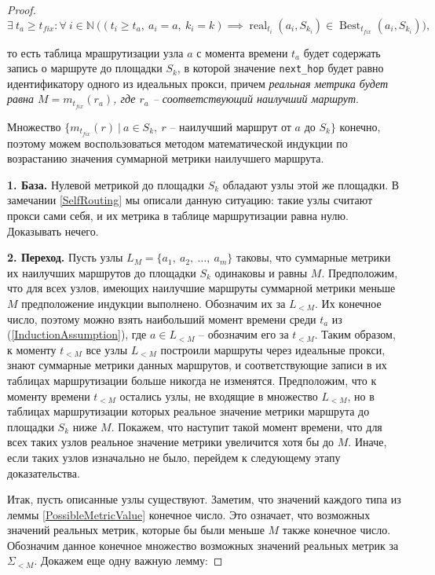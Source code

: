 \documentclass{article}
\theoremstyle{plain}
\theoremstyle{plain}
\theoremstyle{plain}
\theoremstyle{plain}
\theoremstyle{definition}
\theoremstyle{remark}
\theoremstyle{plain}
\DeclareMathOperator*{\real}{real}
\DeclareMathOperator*{\best}{Best}
\begin{document}
\begin{proof}
    \begin{equation}
    \label{InductionAssumption}
        \exists\ t_a \geq t_{fix} : \forall\ i \in \mathbb{N}\ \Big( (t_i \geq t_a,\ a_i = a,\ k_i = k) \implies {\real}_{t_i}(a_i, S_{k_i}) \in {\best}_{t_{fix}}(a_i, S_{k_i}) \Big),
    \end{equation}
    
    то есть таблица мрашрутизации узла $a$ с момента времени $t_a$ будет содержать запись о маршруте до площадки $S_k$, в которой значение \texttt{next\_hop} будет равно идентификатору одного из идеальных прокси, причем \textit{реальная метрика будет равна $M = m_{t_{fix}}(r_a)$, где $r_a$ -- соответствующий наилучший маршрут}.
    
    Множество $\{ m_{t_{fix}}(r)\ |\ a \in S_k,\ r \text{ -- наилучший маршрут от } a \text{ до } S_k \}$ конечно, поэтому можем воспользоваться методом математической индукции по возрастанию значения суммарной метрики наилучшего маршрута.
    
    \textbf{1. База.} Нулевой метрикой до площадки $S_k$ обладают узлы этой же площадки. В замечании \ref{SelfRouting} мы описали данную ситуацию: такие узлы считают прокси сами себя, и их метрика в таблице маршрутизации равна нулю. Доказывать нечего.
    
    \textbf{2. Переход.} Пусть узлы $L_M = \{ a_1,\ a_2,\ \ldots,\ a_m \}$ таковы, что суммарные метрики их наилучших маршрутов до площадки $S_k$ одинаковы и равны $M$. Предположим, что для всех узлов, имеющих наилучшие маршруты суммарной метрики меньше $M$ предположение индукции выполнено. Обозначим их за $L_{< M}$. Их конечное число, поэтому можно взять наибольший момент времени среди $t_a$ из (\ref{InductionAssumption}), где $a \in L_{< M}$ -- обозначим его за $t_{< M}$. Таким образом, к моменту $t_{< M}$ все узлы $L_{< M}$ построили маршруты через идеальные прокси, знают суммарные метрики данных маршрутов, и соответствующие записи в их таблицах маршрутизации больше никогда не изменятся. Предположим, что к моменту времени $t_{< M}$ остались узлы, не входящие в множество $L_{< M}$, но в таблицах маршрутизации которых реальное значение метрики маршрута до площадки $S_k$ ниже $M$. Покажем, что наступит такой момент времени, что для всех таких узлов реальное значение метрики увеличится хотя бы до $M$. Иначе, если таких узлов изначально не было, перейдем к следующему этапу доказательства.
    
    Итак, пусть описанные узлы существуют. Заметим, что значений каждого типа из леммы \ref{PossibleMetricValue} конечное число. Это означает, что возможных значений реальных метрик, которые бы были меньше $M$ также конечное число. Обозначим данное конечное множество возможных значений реальных метрик за $\Sigma_{< M}$. Докажем еще одну важную лемму:
    

\end{proof}
\end{document}
